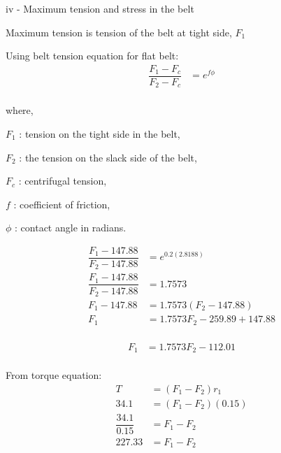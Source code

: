 \documentclass[a4paper, fleqn]{article}
\begin{document}
iv - Maximum tension and stress in the belt

Maximum tension is tension of the belt at tight side, $F_1$

Using belt tension equation for flat belt:
\begin{equation*}
    \begin{aligned}
    \dfrac{F_1-F_c}{F_2-F_c} &= e^{f \phi}\\
    \end{aligned}
\end{equation*}

where, 

$F_1$ : tension on the tight side in the belt, 

$F_2$ : the tension on the slack side of the belt,

$F_c$ : centrifugal tension, 

$f$ : coefficient of friction, 

$\phi$ : contact angle in radians.

\begin{equation*}
    \begin{aligned}
    \dfrac{F_1-147.88}{F_2-147.88} &= e^{0.2(2.8188)}\\
    \dfrac{F_1-147.88}{F_2-147.88} &= 1.7573\\
    F_1 - 147.88 &= 1.7573 (F_2 - 147.88)\\
    F_1 &= 1.7573 F_2 - 259.89 + 147.88\\
    \end{aligned}
\end{equation*}

\begin{equation}
    \begin{aligned}
    F_1 &= 1.7573 F_2 - 112.01\\
    \end{aligned}
    \label{eq1}
\end{equation}

From torque equation:
\begin{equation*}
    \begin{aligned}
    T &= (F_1 - F_2) r_1\\
    34.1 &= (F_1 - F_2) (0.15)\\
    \dfrac{34.1}{0.15}  &= F_1 - F_2\\
    227.33  &= F_1 - F_2\\
    \end{aligned}
\end{equation*}
\end{document}
